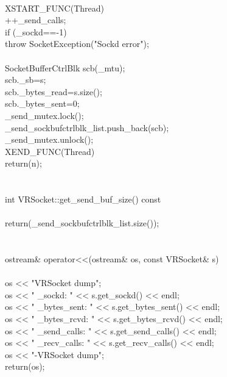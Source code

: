 \documentclass{article}
\begin{document}
 {
\\
         XSTART_FUNC(Thread)
\\
         ++_send_calls;
\\
     if (_sockd==-1) {
\\
         throw SocketException("Sockd error");
\\
     }
\\
         SocketBufferCtrlBlk scb(_mtu);
\\
         scb._sb=s;
\\
         scb._bytes_read=s.size();
\\
         scb._bytes_sent=0;
\\
         _send_mutex.lock();
\\
         _send_sockbufctrlblk_list.push_back(scb);       
\\
         _send_mutex.unlock();
\\
         XEND_FUNC(Thread)
\\
     return(n);
\\
 }
\\
 
\\
 int VRSocket::get_send_buf_size() const
\\
 {
\\
         return(_send_sockbufctrlblk_list.size());
\\
 }
\\
 
\\
 ostream& operator<<(ostream& os, const VRSocket& s)
\\
 {
\\
         os << "VRSocket dump\n";
\\
     os << "    _sockd:         " << s.get_sockd() << endl;
\\
     os << "    _bytes_sent:    " << s.get_bytes_sent() << endl;
\\
     os << "    _bytes_rcvd:    " << s.get_bytes_rcvd() << endl;
\\
     os << "    _send_calls:    " << s.get_send_calls() << endl;
\\
     os << "    _recv_calls:    " << s.get_recv_calls() << endl;
\\
         os << "-VRSocket dump\n";
\\
     return(os);
\\
 }
\end{document}
